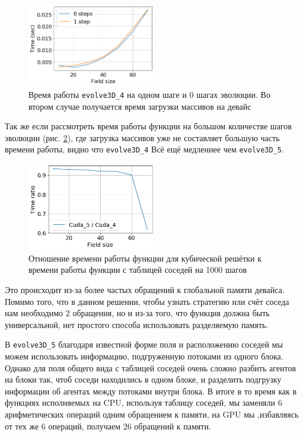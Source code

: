 \documentclass[a4paper,12pt]{article}
\begin{document}
\begin{figure}
	\centering
	\includegraphics[width = 0.5\textwidth]{Images/0_and_1_step_time.png} 
	\caption{Время работы \texttt{evolve3D\_4} на одном шаге и 0 шагах эволюции. Во втором случае получается время загрузки массивов на девайс}
	\label{fig:0_steps}
\end{figure}

Так же если рассмотреть время работы функции на большом количестве шагов эволюции (рис. \ref{fig:1000_step_ratio}), где загрузка массивов уже не составляет большую часть времени работы, видно что \verb|evolve3D_4| Всё ещё медленнее чем \verb|evolve3D_5|.

\begin{figure}[hbt]
	\centering
	\includegraphics[width = 0.5\textwidth]{Images/Cuda_5_to_Cud_4_on_1000_step.png} 
	\caption{Отношение времени работы функции для кубической решётки к времени работы функции с таблицей соседей на 1000 шагов}
	\label{fig:1000_step_ratio}
\end{figure}

Это происходит из-за более частых обращений к глобальной памяти девайса. Помимо того, что в данном решении, чтобы узнать стратегию или счёт соседа нам необходимо 2 обращения, но и из-за того, что функция должна быть универсальной, нет простого способа использовать разделяемую память.

В \verb|evolve3D_5| благодаря известной форме поля и расположению соседей мы можем использовать информацию, подгруженную потоками из одного блока. Однако для поля общего вида с таблицей соседей очень сложно разбить агентов на блоки так, чтоб соседи находились в одном блоке, и  разделить подгрузку информации об агентах между потоками внутри блока. В итоге в то время как в функциях исполняемых на CPU, используя таблицу соседей, мы заменяли 6 арифметических операций одним обращением к памяти, на GPU мы ,избавляясь от тех же 6 операций, получаем 26 обращений к памяти.
\end{document}
